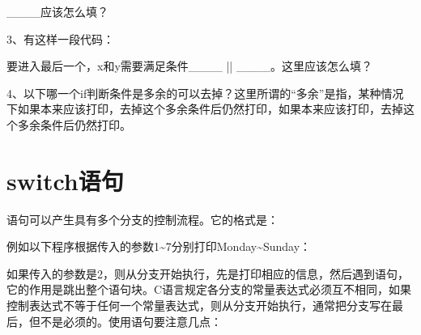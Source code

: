 \_\_\_\_应该怎么填？



3、有这样一段代码：




要进入最后一个，x和y需要满足条件\_\_\_\_ || \_\_\_\_。这里应该怎么填？



4、以下哪一个if判断条件是多余的可以去掉？这里所谓的“多余”是指，某种情况下如果本来应该打印，去掉这个多余条件后仍然打印，如果本来应该打印，去掉这个多余条件后仍然打印。






\section{switch语句}
%
语句可以产生具有多个分支的控制流程。它的格式是：


\begin{BookLiteral}
\BookLiteralLine{\}}
\end{BookLiteral}


例如以下程序根据传入的参数1\textasciitilde{}\BookSplit{}7分别打印Monday\textasciitilde{}\BookSplit{}Sunday：


\begin{BookExampleGraphic}
\end{BookExampleGraphic}


如果传入的参数是2，则从分支开始执行，先是打印相应的信息，然后遇到语句，它的作用是跳出整个语句块。C语言规定各分支的常量表达式必须互不相同，如果控制表达式不等于任何一个常量表达式，则从分支开始执行，通常把分支写在最后，但不是必须的。使用语句要注意几点：


